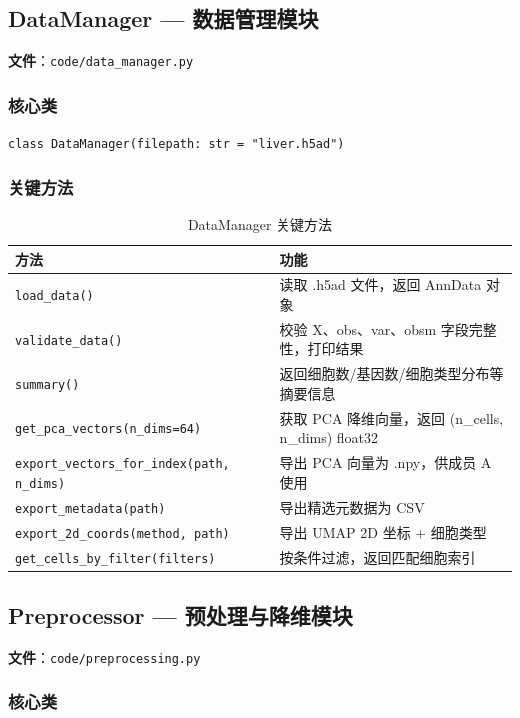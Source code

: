 \documentclass[12pt,a4paper]{ctexart}
\begin{document}
\subsection{DataManager — 数据管理模块}

\textbf{文件}：\texttt{code/data\_manager.py}

\subsubsection{核心类}

\texttt{class DataManager(filepath: str = "liver.h5ad")}

\subsubsection{关键方法}

\begin{table}[H]
\centering
\caption{DataManager 关键方法}
\begin{tabular}{l|p{8cm}}
\toprule
\textbf{方法} & \textbf{功能} \\
\midrule
\texttt{load\_data()}     & 读取 .h5ad 文件，返回 AnnData 对象 \\
\texttt{validate\_data()} & 校验 X、obs、var、obsm 字段完整性，打印结果 \\
\texttt{summary()}        & 返回细胞数/基因数/细胞类型分布等摘要信息 \\
\texttt{get\_pca\_vectors(n\_dims=64)} & 获取 PCA 降维向量，返回 (n\_cells, n\_dims) float32 \\
\texttt{export\_vectors\_for\_index(path, n\_dims)} & 导出 PCA 向量为 .npy，供成员 A 使用 \\
\texttt{export\_metadata(path)} & 导出精选元数据为 CSV \\
\texttt{export\_2d\_coords(method, path)} & 导出 UMAP 2D 坐标 + 细胞类型 \\
\texttt{get\_cells\_by\_filter(filters)} & 按条件过滤，返回匹配细胞索引 \\
\bottomrule
\end{tabular}
\end{table}

\subsection{Preprocessor — 预处理与降维模块}

\textbf{文件}：\texttt{code/preprocessing.py}

\subsubsection{核心类}
\end{document}
